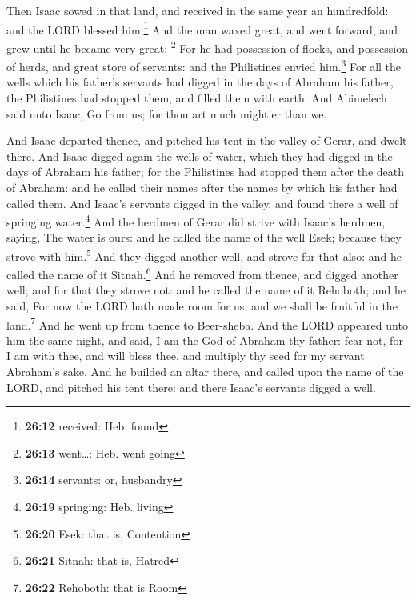  Then Isaac sowed in that land, and received in the same
year an hundredfold: and the LORD blessed him.\footnote{\textbf{26:12}
  received: Heb. found}  And the man waxed great, and
went forward, and grew until he became very great: \footnote{\textbf{26:13}
  went\ldots: Heb. went going}  For he had possession of
flocks, and possession of herds, and great store of servants: and the
Philistines envied him.\footnote{\textbf{26:14} servants: or, husbandry}
 For all the wells which his father's servants had digged
in the days of Abraham his father, the Philistines had stopped them, and
filled them with earth.  And Abimelech said unto Isaac,
Go from us; for thou art much mightier than we.

 And Isaac departed thence, and pitched his tent in the
valley of Gerar, and dwelt there.  And Isaac digged again
the wells of water, which they had digged in the days of Abraham his
father; for the Philistines had stopped them after the death of Abraham:
and he called their names after the names by which his father had called
them.  And Isaac's servants digged in the valley, and
found there a well of springing water.\footnote{\textbf{26:19}
  springing: Heb. living}  And the herdmen of Gerar did
strive with Isaac's herdmen, saying, The water is ours: and he called
the name of the well Esek; because they strove with him.\footnote{\textbf{26:20}
  Esek: that is, Contention}  And they digged another
well, and strove for that also: and he called the name of it
Sitnah.\footnote{\textbf{26:21} Sitnah: that is, Hatred} 
And he removed from thence, and digged another well; and for that they
strove not: and he called the name of it Rehoboth; and he said, For now
the LORD hath made room for us, and we shall be fruitful in the
land.\footnote{\textbf{26:22} Rehoboth: that is Room} 
And he went up from thence to Beer-sheba.  And the LORD
appeared unto him the same night, and said, I am the God of Abraham thy
father: fear not, for I am with thee, and will bless thee, and multiply
thy seed for my servant Abraham's sake.  And he builded
an altar there, and called upon the name of the LORD, and pitched his
tent there: and there Isaac's servants digged a well.

